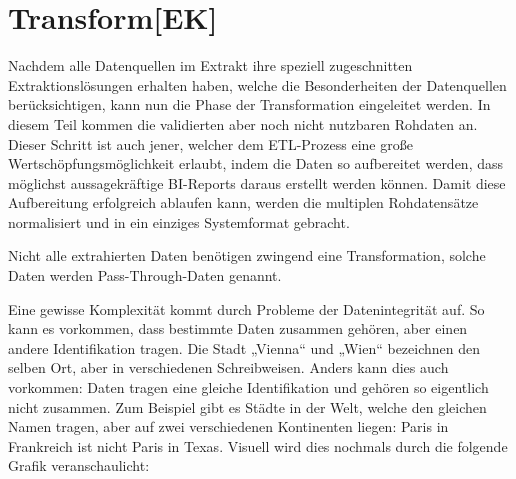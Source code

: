 \newpage
\section{Transform[EK]}\label{sec:transform}
Nachdem alle Datenquellen im Extrakt ihre speziell zugeschnitten Extraktionslösungen erhalten haben, welche die Besonderheiten der Datenquellen berücksichtigen, kann nun die Phase der Transformation eingeleitet werden. In diesem Teil kommen die validierten aber noch nicht nutzbaren Rohdaten an. Dieser Schritt ist auch jener, welcher dem ETL-Prozess eine große Wertschöpfungsmöglichkeit erlaubt, indem die Daten so aufbereitet werden, dass möglichst aussagekräftige BI-Reports daraus erstellt werden können. Damit diese Aufbereitung erfolgreich ablaufen kann, werden die multiplen Rohdatensätze normalisiert und in ein einziges Systemformat gebracht. 
\vspace{5mm}\par
Nicht alle extrahierten Daten benötigen zwingend eine Transformation, solche Daten werden Pass-Through-Daten genannt.
\vspace{5mm}\par
Eine gewisse Komplexität kommt durch Probleme der Datenintegrität auf. So kann es vorkommen, dass bestimmte Daten zusammen gehören, aber einen andere Identifikation tragen. Die Stadt „Vienna“ und „Wien“ bezeichnen den selben Ort, aber in verschiedenen Schreibweisen. Anders kann dies auch vorkommen: Daten tragen eine gleiche Identifikation und gehören so eigentlich nicht zusammen. Zum Beispiel gibt es Städte in der Welt, welche den gleichen Namen tragen, aber auf zwei verschiedenen Kontinenten liegen: Paris in Frankreich ist nicht Paris in Texas. Visuell wird dies nochmals durch die folgende Grafik veranschaulicht:

